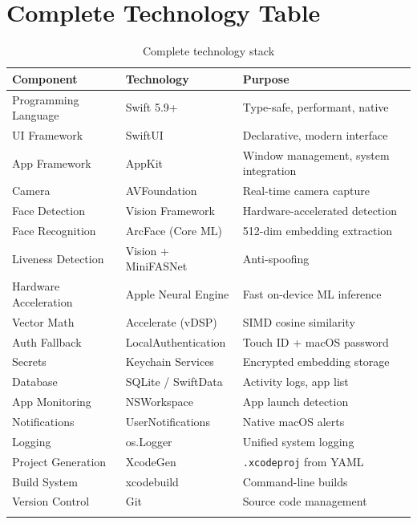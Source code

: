 \documentclass[12pt,a4paper]{report}
\begin{document}
\section{Complete Technology Table}
\begin{longtable}{lll}
\toprule
\textbf{Component} & \textbf{Technology} & \textbf{Purpose} \\
\midrule
\endhead
Programming Language & Swift 5.9+ & Type-safe, performant, native \\
UI Framework & SwiftUI & Declarative, modern interface \\
App Framework & AppKit & Window management, system integration \\
Camera & AVFoundation & Real-time camera capture \\
Face Detection & Vision Framework & Hardware-accelerated detection \\
Face Recognition & ArcFace (Core ML) & 512-dim embedding extraction \\
Liveness Detection & Vision + MiniFASNet & Anti-spoofing \\
Hardware Acceleration & Apple Neural Engine & Fast on-device ML inference \\
Vector Math & Accelerate (vDSP) & SIMD cosine similarity \\
Auth Fallback & LocalAuthentication & Touch ID + macOS password \\
Secrets & Keychain Services & Encrypted embedding storage \\
Database & SQLite / SwiftData & Activity logs, app list \\
App Monitoring & NSWorkspace & App launch detection \\
Notifications & UserNotifications & Native macOS alerts \\
Logging & os.Logger & Unified system logging \\
Project Generation & XcodeGen & \texttt{.xcodeproj} from YAML \\
Build System & xcodebuild & Command-line builds \\
Version Control & Git & Source code management \\
\bottomrule
\caption{Complete technology stack}
\end{longtable}
\end{document}
